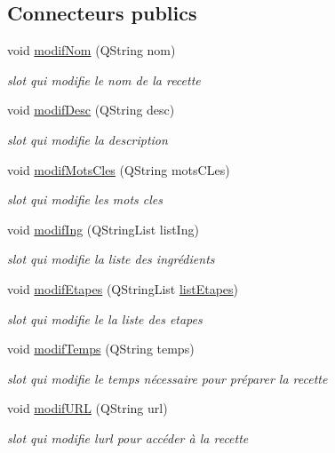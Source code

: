 \subsection*{Connecteurs publics}
\begin{DoxyCompactItemize}
\item 
void \hyperlink{classMainWindow_a38a15d5bcba3d46fef95cb060c8cfb81}{modif\+Nom} (Q\+String nom)
\begin{DoxyCompactList}\small\item\em slot qui modifie le nom de la recette \end{DoxyCompactList}\item 
void \hyperlink{classMainWindow_a8c1e21671da1da3ebb91417ed1745ac2}{modif\+Desc} (Q\+String desc)
\begin{DoxyCompactList}\small\item\em slot qui modifie la description \end{DoxyCompactList}\item 
void \hyperlink{classMainWindow_af8df6e9620b77968cc947db8bbaa6ea7}{modif\+Mots\+Cles} (Q\+String mots\+C\+Les)
\begin{DoxyCompactList}\small\item\em slot qui modifie les mots cles \end{DoxyCompactList}\item 
void \hyperlink{classMainWindow_af9c1008d472c1cbe3ee63a2ee691eebb}{modif\+Ing} (Q\+String\+List list\+Ing)
\begin{DoxyCompactList}\small\item\em slot qui modifie la liste des ingrédients \end{DoxyCompactList}\item 
void \hyperlink{classMainWindow_a323b852ca5189a18a81107f72857a7d8}{modif\+Etapes} (Q\+String\+List \hyperlink{classMainWindow_a1290f4c9df65fb27c870753aa2b24a88}{list\+Etapes})
\begin{DoxyCompactList}\small\item\em slot qui modifie le la liste des etapes \end{DoxyCompactList}\item 
void \hyperlink{classMainWindow_a8bd5bdfbeb09cb4899069f18e07a5f66}{modif\+Temps} (Q\+String temps)
\begin{DoxyCompactList}\small\item\em slot qui modifie le temps nécessaire pour préparer la recette \end{DoxyCompactList}\item 
void \hyperlink{classMainWindow_ac1923d4f0d0f7f91deeac773e2cb16df}{modif\+U\+RL} (Q\+String url)
\begin{DoxyCompactList}\small\item\em slot qui modifie l\textquotesingle{}url pour accéder à la recette \end{DoxyCompactList}\end{DoxyCompactItemize}
